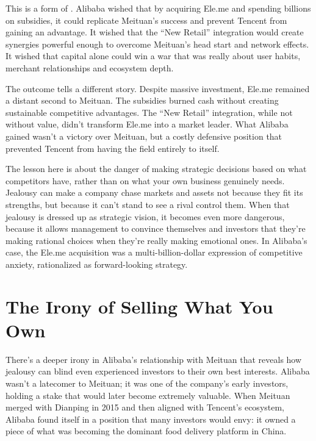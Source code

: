 This is a form of  . Alibaba wished that by acquiring Ele.me and spending billions on subsidies, it could replicate Meituan's success and prevent Tencent from gaining an advantage. It wished that the ``New Retail'' integration would create synergies powerful enough to overcome Meituan's head start and network effects. It wished that capital alone could win a war that was really about user habits, merchant relationships and ecosystem depth.

The outcome tells a different story. Despite massive investment, Ele.me remained a distant second to Meituan. The subsidies burned cash without creating sustainable competitive advantages. The ``New Retail'' integration, while not without value, didn't transform Ele.me into a market leader. What Alibaba gained wasn't a victory over Meituan, but a costly defensive position that prevented Tencent from having the field entirely to itself.

The lesson here is about the danger of making strategic decisions based on what competitors have, rather than on what your own business genuinely needs. Jealousy can make a company chase markets and assets not because they fit its strengths, but because it can't stand to see a rival control them. When that jealousy is dressed up as strategic vision, it becomes even more dangerous, because it allows management to convince themselves and investors that they're making rational choices when they're really making emotional ones. In Alibaba's case, the Ele.me acquisition was a multi-billion-dollar expression of competitive anxiety, rationalized as forward-looking strategy.

\section{The Irony of Selling What You Own}

There's a deeper irony in Alibaba's relationship with Meituan that reveals how jealousy can blind even experienced investors to their own best interests. Alibaba wasn't a latecomer to Meituan; it was one of the company's early investors, holding a stake that would later become extremely valuable. When Meituan merged with Dianping in 2015 and then aligned with Tencent's ecosystem, Alibaba found itself in a position that many investors would envy: it owned a piece of what was becoming the dominant food delivery platform in China.

